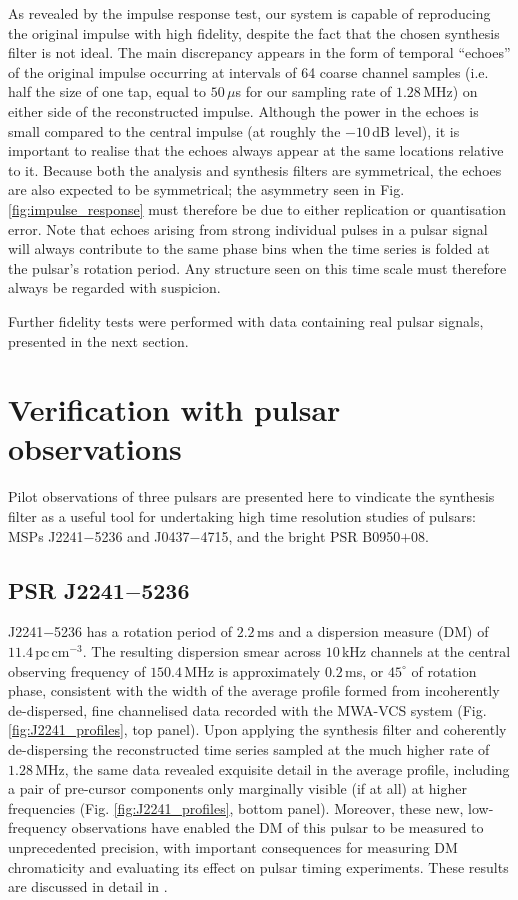 \documentclass{pasa}%
\newcommand{\psrslowB}{B0950$+$08}
\newcommand{\psrkaurJ}{J2241$-$5236}
\newcommand{\psrbhatJ}{J0437$-$4715}
\newcommand{\dmunits}{\ensuremath{\text{pc}\,\text{cm}^{-3}}}
\begin{document}
As revealed by the impulse response test, our system is capable of reproducing the original impulse with high fidelity, despite the fact that the chosen synthesis filter is not ideal.
The main discrepancy appears in the form of temporal ``echoes'' of the original impulse occurring at intervals of 64 coarse channel samples (i.e. half the size of one tap, equal to $50\,\mu$s for our sampling rate of $1.28\,$MHz) on either side of the reconstructed impulse.
Although the power in the echoes is small compared to the central impulse (at roughly the $-10\,$dB level), it is important to realise that the echoes always appear at the same locations relative to it.
Because both the analysis and synthesis filters are symmetrical, the echoes are also expected to be symmetrical; the asymmetry seen in Fig. \ref{fig:impulse_response} must therefore be due to either replication or quantisation error.
Note that echoes arising from strong individual pulses in a pulsar signal will always contribute to the same phase bins when the time series is folded at the pulsar's rotation period.
Any structure seen on this time scale must therefore always be regarded with suspicion.

Further fidelity tests were performed with data containing real pulsar signals, presented in the next section.

\section{Verification with pulsar observations}
\label{sec:pulsardata}

Pilot observations of three pulsars are presented here to vindicate the synthesis filter as a useful tool for undertaking high time resolution studies of pulsars: MSPs \psrkaurJ{} and \psrbhatJ{}, and the bright PSR \psrslowB{}.

\subsection{PSR \psrkaurJ{}}

\psrkaurJ{} has a rotation period of $2.2\,$ms and a dispersion measure (DM) of $11.4\,\dmunits$.
The resulting dispersion smear across $10\,$kHz channels at the central observing frequency of $150.4\,$MHz is approximately $0.2\,$ms, or $45^\circ$ of rotation phase, consistent with the width of the average profile formed from incoherently de-dispersed, fine channelised data recorded with the MWA-VCS system (Fig. \ref{fig:J2241_profiles}, top panel).
Upon applying the synthesis filter and coherently de-dispersing the reconstructed time series sampled at the much higher rate of $1.28\,$MHz, the same data revealed exquisite detail in the average profile, including a pair of pre-cursor components only marginally visible (if at all) at higher frequencies (Fig. \ref{fig:J2241_profiles}, bottom panel).
Moreover, these new, low-frequency observations have enabled the DM of this pulsar to be measured to unprecedented precision, with important consequences for measuring DM chromaticity and evaluating its effect on pulsar timing experiments.
These results are discussed in detail in \citet{Kaur2019}.
\end{document}
